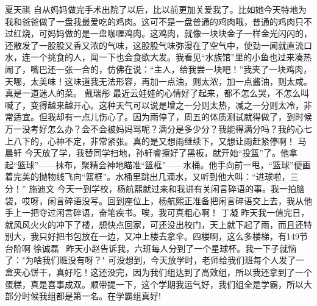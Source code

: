 {}\markdownRendererInterblockSeparator
{}夏天祺\markdownRendererInterblockSeparator
{}自从妈妈做完手术出院了以后，比以前更加关爱我了。比如她今天特地为我和爸爸做了一盘我最爱吃的鸡肉。这可不是一盘普通的鸡肉哦，普通的鸡肉只不过红烧，可妈妈做的是一盘咖喱鸡肉。这鸡肉，就像一块块金子一样金光闪闪的，还散发了一股股又香又浓的气味，这股股气味弥漫在了空气中，使劲一闻就直流口水，连一个挑食的人，闻一下也会食欲大发。我看见“水族馆”里的小鱼也过来凑热闹了，嘴巴还一张一合的，仿佛在说：“主人，给我尝一块吧！”我夹了一块鸡肉，天哪，太美味！这味道我无法形容，再加一点油，则太浓，加一点酱油，则太咸。真是一道迷人的菜。\markdownRendererInterblockSeparator
{}\markdownRendererInterblockSeparator
{}戴瑞彤\markdownRendererInterblockSeparator
{}最近云娃娃的心情好了起来，都不怎么哭，不怎么叫喊了，变得越来越开心。这种天气可以说是增之一分则太热，减之一分则太冷，非常适宜。但我却有一点儿伤心了。因为雨停了，周五的体质测试就得做了，到时候万一没考好怎么办？会不会被妈妈骂呢？满分是多少分？我能得满分吗？我的心七上八下的，心神不定，非常紧张。真的是又想雨继续下，又想让雨赶紧停啊！\markdownRendererInterblockSeparator
{}\markdownRendererInterblockSeparator
{}马晨轩\markdownRendererInterblockSeparator
{}今天放了学，我替同学扫地，孙轩睿擦好了黑板，就开始“投篮”了。他拿起“篮球”——抹布，聚精会神地瞄准“篮框”——水桶。他手向前一甩，“篮球”便画着完美的抛物线飞向“篮框”。水桶里跳出几滴水，又听到他大叫：“进球啦，三分！”\markdownRendererInterblockSeparator
{}\markdownRendererInterblockSeparator
{}施迪文\markdownRendererInterblockSeparator
{}今天一到学校，杨航熙就过来和我讲有关闲言碎语的事。我一拍脑袋，哎呀，闲言碎语没写。回到座位上，杨航熙正准备把闲言碎语交上去，我从他手上一把夺过闲言碎语，奋笔疾书。唉，我可真粗心啊！\markdownRendererInterblockSeparator
{}\markdownRendererInterblockSeparator
{}丁凝\markdownRendererInterblockSeparator
{}昨天我一值完日，就风风火火的冲下了楼，想快点回家，可还没出校门，天上就下起了雨，而且还特别大，我只好把书包放在一边，又冲上楼去拿伞。四楼啊，这么多楼梯，有149节台阶啊\markdownRendererTilde{}\markdownRendererInterblockSeparator
{}\markdownRendererInterblockSeparator
{}徐诚磊\markdownRendererInterblockSeparator
{} 昨天小赵告诉我，六班每人分到了一个星球杯。我一下子就恼了："为啥我们班没有呀？" 可没想到，今天放学时，老师给我们班每个人发了一盒夹心饼干，真好吃！这还没完，因为我们组达到了高效组，所以我还拿到了一个蛋糕，真是喜事成双。顺带提一下，这个学期我运气好，我们组全是学霸，所以大部分时候我组都是第一名。在学霸组真好!\markdownRendererInterblockSeparator
